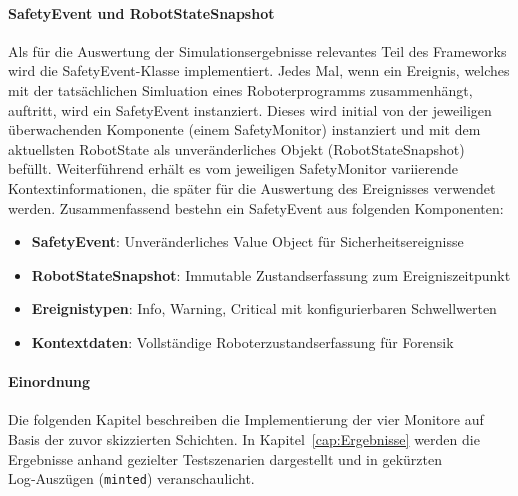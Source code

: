 \paragraph{SafetyEvent und RobotStateSnapshot}
Als für die Auswertung der Simulationsergebnisse relevantes Teil des Frameworks
wird die SafetyEvent-Klasse implementiert. Jedes Mal, wenn ein Ereignis,
welches mit der tatsächlichen Simluation eines Roboterprogramms zusammenhängt,
auftritt, wird ein SafetyEvent instanziert. Dieses wird initial von der
jeweiligen überwachenden Komponente (einem SafetyMonitor) instanziert und mit
dem aktuellsten RobotState als unveränderliches Objekt (RobotStateSnapshot) befüllt.
Weiterführend erhält es vom jeweiligen SafetyMonitor variierende
Kontextinformationen, die später für die Auswertung des Ereignisses verwendet
werden. Zusammenfassend bestehn ein SafetyEvent aus folgenden Komponenten:
\begin{itemize}
	\item \textbf{SafetyEvent}: Unveränderliches Value Object für Sicherheitsereignisse
	\item \textbf{RobotStateSnapshot}: Immutable Zustandserfassung zum Ereigniszeitpunkt
	\item \textbf{Ereignistypen}: Info, Warning, Critical mit konfigurierbaren Schwellwerten
	\item \textbf{Kontextdaten}: Vollständige Roboterzustandserfassung für Forensik
\end{itemize}

\paragraph{Einordnung}
Die folgenden Kapitel beschreiben die Implementierung der vier Monitore auf Basis
der zuvor skizzierten Schichten. In Kapitel~\ref{cap:Ergebnisse} werden die
Ergebnisse anhand gezielter Testszenarien dargestellt und in gekürzten
Log‑Auszügen (\texttt{minted}) veranschaulicht.
